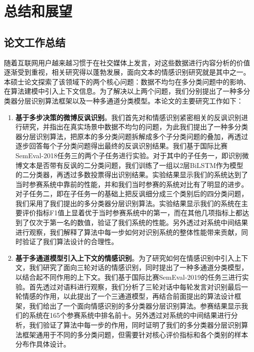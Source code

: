 \chapter{总结和展望}
\label{cha:conclusion}

\section{论文工作总结}

随着互联网用户越来越习惯于在社交媒体上发言，对这些数据进行内容分析的价值逐渐受到重视，相关研究得以蓬勃发展，面向文本的情感识别研究就是其中之一。本硕士论文探索了该领域下的两个核心问题：数据不均匀在多分类问题中的影响、在算法建模中引入上下文信息。为了解决以上两个问题，我们分别提出了一种多分类器分层识别算法框架以及一种多通道分类模型。本论文的主要研究工作如下：

\begin{enumerate}

\item {\bf 基于多步决策的微博反讽识别}。我们首先对和情感识别紧密相关的反讽识别进行研究，并指出在真实场景中数据不均匀的问题，为此我们提出了一种多分类器分层识别算法，把原本的多分类问题拆解成多个子分类问题的叠加，再透过逐步回答每个子分类问题得出最终的反讽识别结果。我们基于国际比赛SemEval-2018任务三的两个子任务进行实验。对于其中的子任务一，即识别微博文本是否带有反讽的二分类问题，我们训练了一组以2层BiLSTM作为模型的二分类器，再透过多数投票得出识别结果。实验结果显示我们的系统达到了当时参赛系统中靠前的性能，并和我们当时参赛的系统对比有了明显的进步。对子任务二，即在子任务一的基础上把反讽细分成三个类别后的四分类问题，我们采用了我们提出的多分类器分层识别算法。实验结果显示我们的系统在主要评价指标F1值上显着优于当时参赛系统中的第一，而在其他几项指标上都达到了仅次于第一名的数值，验证了我们系统的性能。另外透过对系统中间结果进行观察，我们解释了算法中每一步如何对识别系统的整体性能带来贡献，同时验证了我们算法设计的合理性。

\item {\bf 基于多通道模型引入上下文的情感识别}。为了研究如何在情感识别中引入上下文，我们研究了面向三轮对话的情感识别，同时提出了一种多通道分类模型，以结合起不同作用的上下文。我们基于国际比赛SemEval-2019的任务三进行实验。首先透过对语料进行观察，我们分析了三轮对话中每轮发言对识别最后一轮情感的作用，以此提出了一个三通道模型，再结合前面提出的算法设计框架，我们给出了一个面向情感识别的多分类器分层识别算法。参赛结果显示我们的系统在165个参赛系统中排名前十。另外透过对系统的中间结果进行分析，我们验证了算法中每一步的作用，同时证明了我们的多分类器分层识别算法框架通用于不同的多分类问题，但需要针对核心评价指标和各个类别的样本分布作具体设计。

\end{enumerate}

